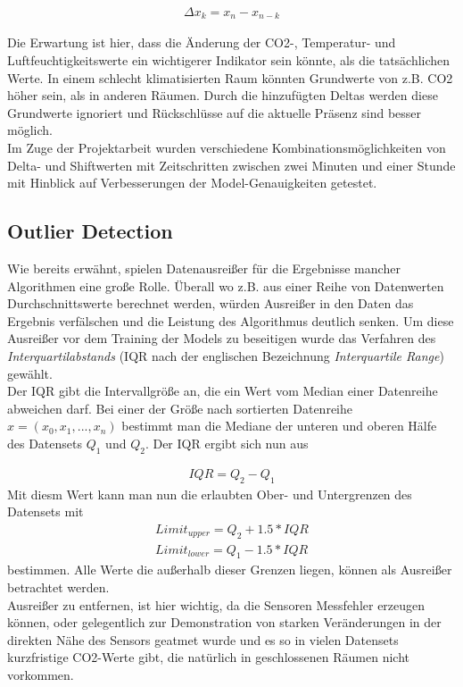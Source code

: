 \begin{align}
    \Delta x_k = x_n - x_{n-k}    
\end{align}

Die Erwartung ist hier, dass die Änderung der CO2-, Temperatur- und 
Luftfeuchtigkeitswerte ein wichtigerer Indikator sein könnte, als die tatsächlichen Werte. In einem schlecht 
klimatisierten Raum könnten Grundwerte von z.B. CO2 höher sein, als in anderen Räumen. Durch die hinzufügten 
Deltas werden diese Grundwerte ignoriert und Rückschlüsse auf die aktuelle Präsenz sind besser möglich.\\
Im Zuge der Projektarbeit wurden verschiedene Kombinationsmöglichkeiten von Delta- und Shiftwerten mit 
Zeitschritten zwischen zwei Minuten und einer Stunde mit Hinblick auf Verbesserungen der Model-Genauigkeiten 
getestet.

\subsection{Outlier Detection}
Wie bereits erwähnt, spielen Datenausreißer für die Ergebnisse mancher Algorithmen eine große Rolle. Überall 
wo z.B. aus einer Reihe von Datenwerten Durchschnittswerte berechnet werden, würden Ausreißer in den Daten das 
Ergebnis verfälschen und die Leistung des Algorithmus deutlich senken.
Um diese Ausreißer vor dem Training der Models zu beseitigen wurde das Verfahren des 
\textit{Interquartilabstands} (IQR nach der englischen Bezeichnung \textit{Interquartile Range}) gewählt.\\
Der IQR gibt die Intervallgröße an, die ein Wert vom Median einer Datenreihe abweichen darf. Bei einer 
der Größe nach sortierten Datenreihe $x = (x_0,x_1,...,x_n)$ bestimmt man die Mediane der unteren und oberen 
Hälfe des Datensets $Q_1$ und $Q_2$. Der IQR ergibt sich nun aus 

\begin{align}
    IQR = Q_2 - Q_1
\end{align}
Mit diesm Wert kann man nun die erlaubten Ober- und Untergrenzen 
des Datensets mit 
\begin{align}
    Limit_{upper} = Q_2 + 1.5 * IQR \\
    Limit_{lower} = Q_1 - 1.5 * IQR
\end{align} 
bestimmen. Alle Werte die außerhalb dieser Grenzen liegen, können als Ausreißer betrachtet werden.\\
Ausreißer zu entfernen, ist hier wichtig, da die Sensoren Messfehler erzeugen können, oder gelegentlich zur 
Demonstration von starken Veränderungen in der direkten Nähe des Sensors geatmet wurde und es so in vielen 
Datensets kurzfristige CO2-Werte gibt, die natürlich in geschlossenen Räumen nicht vorkommen.

